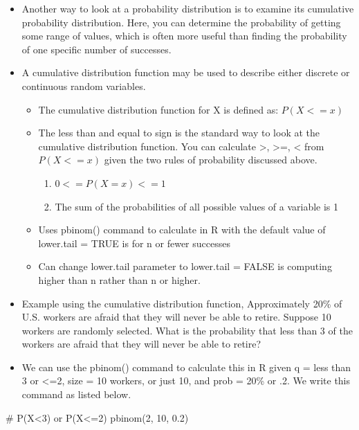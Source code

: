 \documentclass[
  letterpaper,
  DIV=11,
  numbers=noendperiod]{scrreprt}
\newenvironment{Shaded}{\begin{snugshade}}{\end{snugshade}}
\newcommand{\CommentTok}[1]{\textcolor[rgb]{0.37,0.37,0.37}{#1}}
\newcommand{\DecValTok}[1]{\textcolor[rgb]{0.68,0.00,0.00}{#1}}
\newcommand{\FloatTok}[1]{\textcolor[rgb]{0.68,0.00,0.00}{#1}}
\newcommand{\FunctionTok}[1]{\textcolor[rgb]{0.28,0.35,0.67}{#1}}
\newcommand{\NormalTok}[1]{\textcolor[rgb]{0.00,0.23,0.31}{#1}}
\providecommand{\tightlist}{%
  \setlength{\itemsep}{0pt}\setlength{\parskip}{0pt}}\usepackage{longtable,booktabs,array}
\begin{document}
\begin{itemize}
\tightlist
\item
  Another way to look at a probability distribution is to examine its
  cumulative probability distribution. Here, you can determine the
  probability of getting some range of values, which is often more
  useful than finding the probability of one specific number of
  successes.
\item
  A cumulative distribution function may be used to describe either
  discrete or continuous random variables.

  \begin{itemize}
  \tightlist
  \item
    The cumulative distribution function for X is defined as:
    \(P(X<=x)\)
  \item
    The less than and equal to sign is the standard way to look at the
    cumulative distribution function. You can calculate \textgreater,
    \textgreater=, \textless{} from \(P(X<=x)\) given the two rules of
    probability discussed above.

    \begin{enumerate}
    \def\labelenumi{\arabic{enumi}.}
    \tightlist
    \item
      \(0 <= P(X=x) <= 1\)
    \item
      The sum of the probabilities of all possible values of a variable
      is 1
    \end{enumerate}
  \item
    Uses pbinom() command to calculate in R with the default value of
    lower.tail = TRUE is for n or fewer successes
  \item
    Can change lower.tail parameter to lower.tail = FALSE is computing
    higher than n rather than n or higher.
  \end{itemize}
\item
  Example using the cumulative distribution function, Approximately 20\%
  of U.S. workers are afraid that they will never be able to retire.
  Suppose 10 workers are randomly selected. What is the probability that
  less than 3 of the workers are afraid that they will never be able to
  retire?
\item
  We can use the pbinom() command to calculate this in R given q = less
  than 3 or \textless=2, size = 10 workers, or just 10, and prob = 20\%
  or .2. We write this command as listed below.
\end{itemize}

\begin{Shaded}
\begin{Highlighting}[]
\CommentTok{\# P(X\textless{}3) or P(X\textless{}=2)}
\FunctionTok{pbinom}\NormalTok{(}\DecValTok{2}\NormalTok{, }\DecValTok{10}\NormalTok{, }\FloatTok{0.2}\NormalTok{)}
\end{Highlighting}
\end{Shaded}
\end{document}
